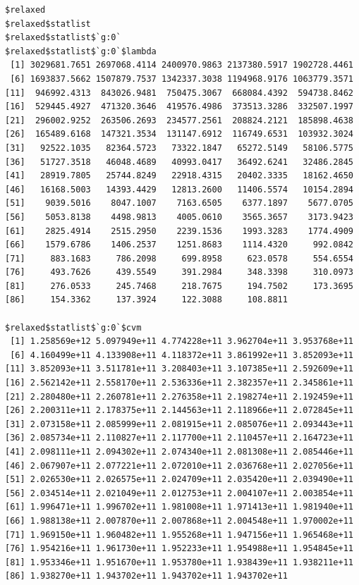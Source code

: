 \documentclass[
]{article}
\begin{document}
\begin{verbatim}
$relaxed
$relaxed$statlist
$relaxed$statlist$`g:0`
$relaxed$statlist$`g:0`$lambda
 [1] 3029681.7651 2697068.4114 2400970.9863 2137380.5917 1902728.4461
 [6] 1693837.5662 1507879.7537 1342337.3038 1194968.9176 1063779.3571
[11]  946992.4313  843026.9481  750475.3067  668084.4392  594738.8462
[16]  529445.4927  471320.3646  419576.4986  373513.3286  332507.1997
[21]  296002.9252  263506.2693  234577.2561  208824.2121  185898.4638
[26]  165489.6168  147321.3534  131147.6912  116749.6531  103932.3024
[31]   92522.1035   82364.5723   73322.1847   65272.5149   58106.5775
[36]   51727.3518   46048.4689   40993.0417   36492.6241   32486.2845
[41]   28919.7805   25744.8249   22918.4315   20402.3335   18162.4650
[46]   16168.5003   14393.4429   12813.2600   11406.5574   10154.2894
[51]    9039.5016    8047.1007    7163.6505    6377.1897    5677.0705
[56]    5053.8138    4498.9813    4005.0610    3565.3657    3173.9423
[61]    2825.4914    2515.2950    2239.1536    1993.3283    1774.4909
[66]    1579.6786    1406.2537    1251.8683    1114.4320     992.0842
[71]     883.1683     786.2098     699.8958     623.0578     554.6554
[76]     493.7626     439.5549     391.2984     348.3398     310.0973
[81]     276.0533     245.7468     218.7675     194.7502     173.3695
[86]     154.3362     137.3924     122.3088     108.8811

$relaxed$statlist$`g:0`$cvm
 [1] 1.258569e+12 5.097949e+11 4.774228e+11 3.962704e+11 3.953768e+11
 [6] 4.160499e+11 4.133908e+11 4.118372e+11 3.861992e+11 3.852093e+11
[11] 3.852093e+11 3.511781e+11 3.208403e+11 3.107385e+11 2.592609e+11
[16] 2.562142e+11 2.558170e+11 2.536336e+11 2.382357e+11 2.345861e+11
[21] 2.280480e+11 2.260781e+11 2.276358e+11 2.198274e+11 2.192459e+11
[26] 2.200311e+11 2.178375e+11 2.144563e+11 2.118966e+11 2.072845e+11
[31] 2.073158e+11 2.085999e+11 2.081915e+11 2.085076e+11 2.093443e+11
[36] 2.085734e+11 2.110827e+11 2.117700e+11 2.110457e+11 2.164723e+11
[41] 2.098111e+11 2.094302e+11 2.074340e+11 2.081308e+11 2.085446e+11
[46] 2.067907e+11 2.077221e+11 2.072010e+11 2.036768e+11 2.027056e+11
[51] 2.026530e+11 2.026575e+11 2.024709e+11 2.035420e+11 2.039490e+11
[56] 2.034514e+11 2.021049e+11 2.012753e+11 2.004107e+11 2.003854e+11
[61] 1.996471e+11 1.996702e+11 1.981008e+11 1.971413e+11 1.981940e+11
[66] 1.988138e+11 2.007870e+11 2.007868e+11 2.004548e+11 1.970002e+11
[71] 1.969150e+11 1.960482e+11 1.955268e+11 1.947156e+11 1.965468e+11
[76] 1.954216e+11 1.961730e+11 1.952233e+11 1.954988e+11 1.954845e+11
[81] 1.953346e+11 1.951670e+11 1.953780e+11 1.938439e+11 1.938211e+11
[86] 1.938270e+11 1.943702e+11 1.943702e+11 1.943702e+11


\end{verbatim}
\end{document}
